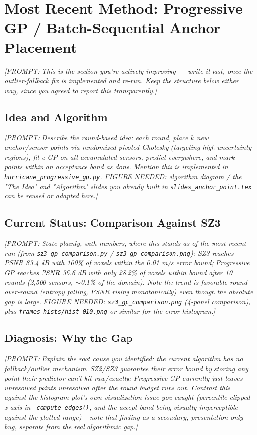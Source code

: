 \documentclass[11pt]{article}
\newcommand{\prompt}[1]{{\color{red}\itshape [PROMPT: #1]}\par\medskip}
\begin{document}
\section{Most Recent Method: Progressive GP / Batch-Sequential Anchor Placement}
\label{sec:progressive-gp}

\prompt{This is the section you're actively improving --- write it last,
once the outlier-fallback fix is implemented and re-run. Keep the
structure below either way, since you agreed to report this
transparently.}

\subsection{Idea and Algorithm}
\prompt{Describe the round-based idea: each round, place $k$ new
anchor/sensor points via randomized pivoted Cholesky (targeting
high-uncertainty regions), fit a GP on all accumulated sensors, predict
everywhere, and mark points within an acceptance band as done. Mention
this is implemented in \texttt{hurricane\_progressive\_gp.py}.
FIGURE NEEDED: algorithm diagram / the "The Idea" and "Algorithm"
slides you already built in \texttt{slides\_anchor\_point.tex} can be
reused or adapted here.}

\subsection{Current Status: Comparison Against SZ3}
\prompt{State plainly, with numbers, where this stands as of the most
recent run (from \texttt{sz3\_gp\_comparison.py} / \texttt{sz3\_gp\_comparison.png}):
SZ3 reaches PSNR 83.4 dB with 100\% of voxels within the 0.01 m/s error
bound; Progressive GP reaches PSNR 36.6 dB with only 28.2\% of voxels
within bound after 10 rounds (2,500 sensors, $\sim$0.1\% of the domain).
Note the trend is favorable round-over-round (entropy falling,
PSNR rising monotonically) even though the absolute gap is large.
FIGURE NEEDED: \texttt{sz3\_gp\_comparison.png} (4-panel comparison),
plus \texttt{frames\_hists/hist\_010.png} or similar for the error
histogram.}

\subsection{Diagnosis: Why the Gap}
\prompt{Explain the root cause you identified: the current algorithm
has no fallback/outlier mechanism. SZ2/SZ3 guarantee their error bound
by storing any point their predictor can't hit raw/exactly; Progressive
GP currently just leaves unresolved points unresolved after the round
budget runs out. Contrast this against the histogram plot's own
visualization issue you caught (percentile-clipped x-axis in
\texttt{\_compute\_edges()}, and the accept band being visually
imperceptible against the plotted range) -- note that finding as a
secondary, presentation-only bug, separate from the real algorithmic gap.}
\end{document}
